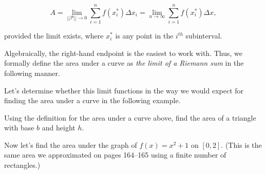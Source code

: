 \documentclass[12pt]{article}
\begin{document}
$$A=\lim_{||\mathcal{P}||\to 0}\sum_{i=1}^n f(x_i^*)\Delta x_i=\lim_{n\to \infty}\sum_{i=1}^n f(x_i^*)\Delta x,$$

\vspace{3mm}

provided the limit exists, where $x_i^*$ is any point in the $i^{th}$ subinterval.

\newpage

Algebraically, the right-hand endpoint is the easiest to work with. Thus, we formally define the area under a curve as \textit{the limit of a Riemann sum} in the following manner.

\vspace{3mm}


\vspace{5mm}

Let's determine whether this limit functions in the way we would expect for finding the area under a curve in the following example.

\Example Using the definition for the area under a curve above, find the area of a triangle with base $b$ and height $h$.

\newpage 

\Example Now let's find the area under the graph of $f(x)=x^2+1$ on $[0,2]$. (This is the same area we approximated on pages 164--165 using a finite number of rectangles.)

\vspace{3mm}

\begin{flushright}
\end{flushright}
\end{document}
